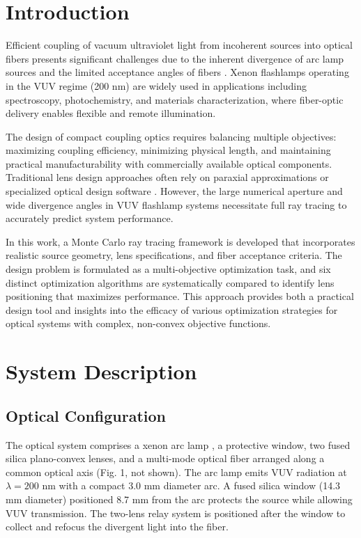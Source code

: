 \section{Introduction}

Efficient coupling of vacuum ultraviolet light from incoherent sources into optical fibers presents significant challenges due to the inherent divergence of arc lamp sources and the limited acceptance angles of fibers \cite{hecht2017}. Xenon flashlamps operating in the VUV regime (200 nm) are widely used in applications including spectroscopy, photochemistry, and materials characterization, where fiber-optic delivery enables flexible and remote illumination.

The design of compact coupling optics requires balancing multiple objectives: maximizing coupling efficiency, minimizing physical length, and maintaining practical manufacturability with commercially available optical components. Traditional lens design approaches often rely on paraxial approximations or specialized optical design software \cite{greivenkamp2004}. However, the large numerical aperture and wide divergence angles in VUV flashlamp systems necessitate full ray tracing to accurately predict system performance.

In this work, a Monte Carlo ray tracing framework is developed that incorporates realistic source geometry, lens specifications, and fiber acceptance criteria. The design problem is formulated as a multi-objective optimization task, and six distinct optimization algorithms are systematically compared to identify lens positioning that maximizes performance. This approach provides both a practical design tool and insights into the efficacy of various optimization strategies for optical systems with complex, non-convex objective functions.

\section{System Description}

\subsection{Optical Configuration}

The optical system comprises a xenon arc lamp \cite{hamamatsu}, a protective window, two fused silica plano-convex lenses, and a multi-mode optical fiber \cite{accuglass} arranged along a common optical axis (Fig. 1, not shown). The arc lamp emits VUV radiation at $\lambda = 200$ nm with a compact 3.0 mm diameter arc. A fused silica window (14.3 mm diameter) positioned 8.7 mm from the arc protects the source while allowing VUV transmission. The two-lens relay system is positioned after the window to collect and refocus the divergent light into the fiber.

